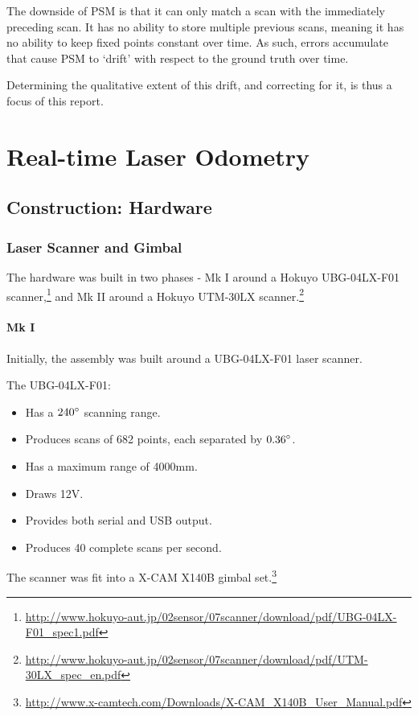 \documentclass[12pt,oneside,a4paper,draft]{book}
\begin{document}
The downside of PSM is that it can only match a scan with the
immediately preceding scan. It has no ability to store multiple
previous scans, meaning it has no ability to keep fixed points
constant over time. As such, errors accumulate that cause PSM to
`drift' with respect to the ground truth over time.

Determining the qualitative extent of this drift, and correcting for
it, is thus a focus of this report.

\part{Real-time Laser Odometry}
\chapter{Construction: Hardware}
\label{sec:hardware}

\section{Laser Scanner and Gimbal}
\label{sec:laser-scanner-gimbal}

The hardware was built in two phases - Mk I around a Hokuyo
UBG-04LX-F01
scanner,\footnote{\url{http://www.hokuyo-aut.jp/02sensor/07scanner/download/pdf/UBG-04LX-F01_spec1.pdf}}
and Mk II around a Hokuyo UTM-30LX scanner.\footnote{\url{http://www.hokuyo-aut.jp/02sensor/07scanner/download/pdf/UTM-30LX_spec_en.pdf}}


\subsection{Mk I}
\label{sec:mk-i}

Initially, the assembly was built around a UBG-04LX-F01 laser
scanner.

The UBG-04LX-F01:
\begin{itemize}
\item Has a $240\degree$ scanning range.
\item Produces scans of 682 points, each separated by $0.36\degree$.
\item Has a maximum range of 4000mm.
\item Draws 12V.
\item Provides both serial and USB output.
\item Produces 40 complete scans per second.
\end{itemize}

The scanner was fit into a X-CAM X140B gimbal set.\footnote{\url{http://www.x-camtech.com/Downloads/X-CAM_X140B_User_Manual.pdf}}
\end{document}
